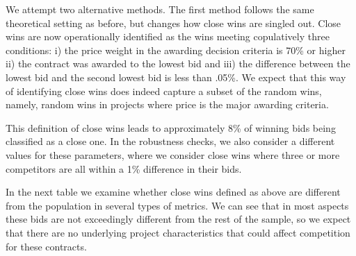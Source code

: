 We attempt two alternative methods. The first method follows the same theoretical setting as before, but changes how close wins are singled out. Close wins are now operationally identified as the wins meeting copulatively  three conditions: i) the price weight in the awarding decision criteria is 70\% or higher ii) the contract was awarded to the lowest bid and iii) the difference between the lowest bid and the second lowest bid is less than .05\%. We expect that this way of identifying close wins does indeed capture a subset of the random wins, namely, random wins in projects where price is the major awarding criteria.

This definition of close wins leads to approximately 8\% of winning bids being classified as a close one. In the robustness checks, we also consider a different values for these parameters, where we consider close wins where three or more competitors are all within a 1\% difference in their bids.

In the next table we examine whether close wins defined as  above are different from the population in several types of metrics. We can see that in most aspects these bids are not exceedingly different from the rest of the sample, so we expect that there are no underlying project characteristics that could affect competition for these contracts.

\begin{table}[!h]
\caption{Comparison of key statistics between close wins(<0.05\% difference between 1st and runner-up) and regular wins}
\centering
{}
\end{table}




